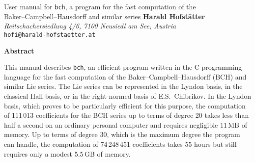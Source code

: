 \documentclass[11pt,a4paper]{article}
\begin{document}
\begin{center}
    {\LARGE User manual for {\tt bch}, a program for the fast computation of the\\[2mm]
    Baker--Campbell--Hausdorff and similar series}
\vskip 20pt
{\bf Harald Hofst\"atter}\\ %
{\small\it Reitschachersiedlung 4/6, 7100 Neusiedl am See, Austria}\\
{\tt hofi@harald-hofstaetter.at}\\ %
\end{center}
\vskip 20pt



\centerline{\bf Abstract}
\noindent
This manual describes \verb|bch|, 
an efficient  program written in the C programming language for the fast computation
of the Baker--Campbell--Hausdorff (BCH) and similar Lie series.
The Lie series can be represented in the Lyndon basis, in the
classical Hall basis, or in the right-normed basis of 
E.S.~Chibrikov.  In the Lyndon basis,
which proves to be particularly efficient for this purpose,
the computation of 111\,013 coefficients for the BCH series up to terms of degree 20
takes less than half a second on an ordinary personal computer and requires negligible 11\,MB of memory.
Up to terms of degree 30, which is the maximum degree the program can handle, 
the computation of 74\,248\,451 coefficients takes 55 hours but still requires only a modest 5.5\,GB of  memory.


\vskip 30pt

\end{document}
